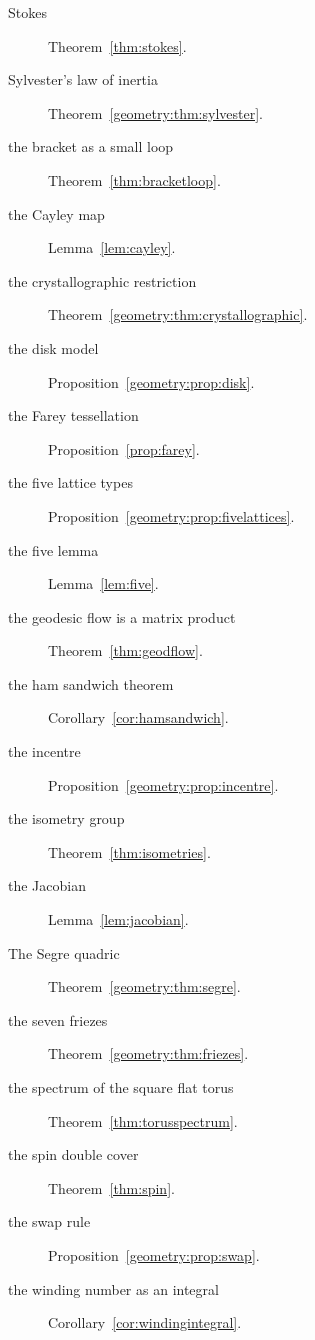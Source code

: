 \begin{description}
\item[Stokes] Theorem~\ref{thm:stokes}.
\item[Sylvester's law of inertia] Theorem~\ref{geometry:thm:sylvester}.
\item[the bracket as a small loop] Theorem~\ref{thm:bracketloop}.
\item[the Cayley map] Lemma~\ref{lem:cayley}.
\item[the crystallographic restriction] Theorem~\ref{geometry:thm:crystallographic}.
\item[the disk model] Proposition~\ref{geometry:prop:disk}.
\item[the Farey tessellation] Proposition~\ref{prop:farey}.
\item[the five lattice types] Proposition~\ref{geometry:prop:fivelattices}.
\item[the five lemma] Lemma~\ref{lem:five}.
\item[the geodesic flow is a matrix product] Theorem~\ref{thm:geodflow}.
\item[the ham sandwich theorem] Corollary~\ref{cor:hamsandwich}.
\item[the incentre] Proposition~\ref{geometry:prop:incentre}.
\item[the isometry group] Theorem~\ref{thm:isometries}.
\item[the Jacobian] Lemma~\ref{lem:jacobian}.
\item[The Segre quadric] Theorem~\ref{geometry:thm:segre}.
\item[the seven friezes] Theorem~\ref{geometry:thm:friezes}.
\item[the spectrum of the square flat torus] Theorem~\ref{thm:torusspectrum}.
\item[the spin double cover] Theorem~\ref{thm:spin}.
\item[the swap rule] Proposition~\ref{geometry:prop:swap}.
\item[the winding number as an integral] Corollary~\ref{cor:windingintegral}.

\end{description}
